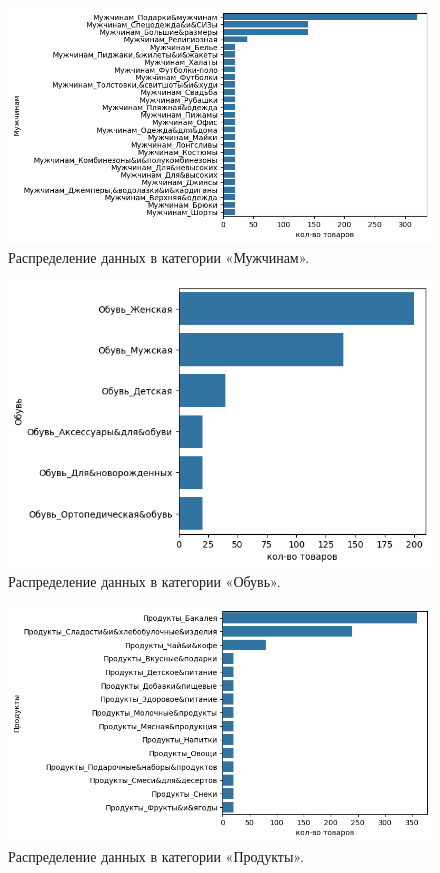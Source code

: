 \documentclass[a4paper,12pt]{extarticle}
\begin{document}
\begin{figure}[hbtp]
	\centering
	\includegraphics[scale=0.8]{приложения/amount_of_category_Мужчинам.png}
	\caption{Распределение данных в категории «Мужчинам».}
	\label{fig:amount_of_category_Мужчинам}
\end{figure}

\begin{figure}[hbtp]
	\centering
	\includegraphics[scale=0.8]{приложения/amount_of_category_Обувь.png}
	\caption{Распределение данных в категории «Обувь».}
	\label{fig:amount_of_category_Обувь}
\end{figure}

\begin{figure}[hbtp]
	\centering
	\includegraphics[scale=0.8]{приложения/amount_of_category_Продукты.png}
	\caption{Распределение данных в категории «Продукты».}
	\label{fig:amount_of_category_Продукты}
\end{figure}
\end{document}
